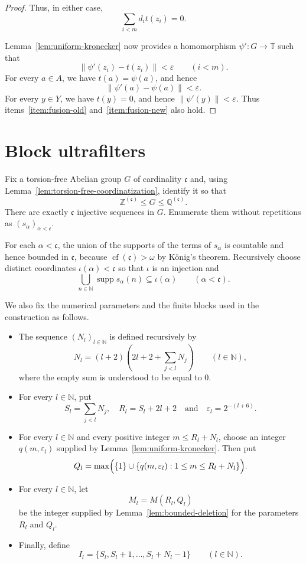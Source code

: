 \documentclass[11pt]{amsart}
\theoremstyle{definition}
\newcommand{\T}{\mathbb T}
\newcommand{\N}{\mathbb N}
\newcommand{\Z}{\mathbb Z}
\newcommand{\Q}{\mathbb Q}
\newcommand{\cfrak}{\mathfrak c}
\newcommand{\supp}{\operatorname{supp}}
\begin{document}
\begin{proof}
Thus, in either case,
\[
\sum_{i<m}d_i t(z_i)=0.
\]

Lemma~\ref{lem:uniform-kronecker} now provides a homomorphism
$\psi':G\to\T$ such that
\[
\|\psi'(z_i)-t(z_i)\|<\varepsilon
\qquad(i<m).
\]
For every $a\in A$, we have $t(a)=\psi(a)$, and hence
\[
\|\psi'(a)-\psi(a)\|<\varepsilon.
\]
For every $y\in Y$, we have $t(y)=0$, and hence $\|\psi'(y)\|<\varepsilon$.
Thus items~\ref{item:fusion-old} and~\ref{item:fusion-new} also hold.
\end{proof}

\section{Block ultrafilters}\label{sec:block-ultrafilters}

Fix a torsion-free Abelian group $G$ of cardinality $\cfrak$ and, using
Lemma~\ref{lem:torsion-free-coordinatization}, identify it so that
\[
 \Z^{(\cfrak)}\leq G\leq\Q^{(\cfrak)}.
\]
There are exactly $\cfrak$ injective sequences in $G$.  Enumerate them without repetitions as
$(s_\alpha)_{\alpha<\cfrak}$.

For each $\alpha<\cfrak$, the union of the supports of the terms of
$s_\alpha$ is countable and hence bounded in $\cfrak$, because
$\operatorname{cf}(\cfrak)>\omega$ by K\"onig's theorem.  Recursively choose
distinct coordinates $\iota(\alpha)<\cfrak$ so that $\iota$ is an injection
and
\[
 \bigcup_{n\in\N}\supp s_\alpha(n)
 \subseteq\iota(\alpha)
 \qquad(\alpha<\cfrak).
\]

We also fix the numerical parameters and the finite blocks used in the
construction as follows.

\begin{itemize}[
    leftmargin=*,
    itemsep=1.25em,
    topsep=0.75em
]

\item 
The sequence $(N_l)_{l\in\N}$ is defined recursively by
\[
N_l
=
(l+2)
\left(
2l+2+\sum_{j<l}N_j
\right)
\qquad(l\in\N),
\]
where the empty sum is understood to be equal to $0$.

\item 
For every $l\in\N$, put
\begin{equation}\label{eq:local-stage-properties2}
S_l=\sum_{j<l}N_j,
\quad
R_l=S_l+2l+2\quad \text{and} \quad \varepsilon_l=2^{-(l+6)}.
\end{equation}

\item 
For every $l\in\N$ and every positive integer
$m\leq R_l+N_l$, choose an integer $q(m,\varepsilon_l)$ supplied by
Lemma~\ref{lem:uniform-kronecker}. Then put
\[
Q_l
=
\max\Bigl(
\{1\}\cup
\{q(m,\varepsilon_l):1\leq m\leq R_l+N_l\}
\Bigr).
\]

\item 
For every $l\in\N$, let
\[
M_l=M(R_l,Q_l)
\]
be the integer supplied by Lemma~\ref{lem:bounded-deletion} for the
parameters $R_l$ and $Q_l$.

\item 
Finally, define
\[
I_l
=
\{S_l,S_l+1,\ldots,S_l+N_l-1\}
\qquad(l\in\N).
\]

\end{itemize}
\end{document}

